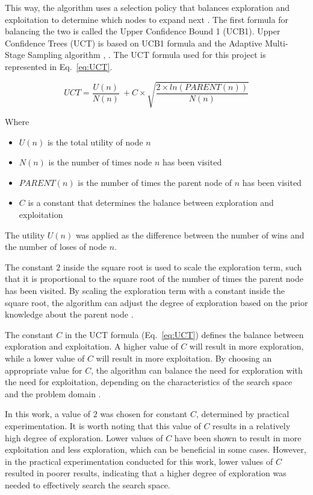 \documentclass[journal]{IEEEtran}
\begin{document}
This way, the algorithm uses a selection policy that balances exploration and exploitation to determine which nodes to expand next \cite{russell2020}. 
The first formula for balancing the two is called the Upper Confidence Bound 1 (UCB1). Upper Confidence Trees (UCT) is based on UCB1 formula and the Adaptive Multi-Stage Sampling algorithm \cite{Chang2005}, \cite{joppen2021}. The UCT formula used for this project is represented in Eq.~\ref{eq:UCT}.

\begin{equation}
    \label{eq:UCT}
    UCT = \frac{U(n)}{N(n)}\ + C \times \sqrt{\frac{2 \times ln(PARENT(n))}{N(n)}} 
\end{equation}

Where 
\begin{itemize}
    \item $U(n)$ is the total utility of node $n$
    \item $N(n)$ is the number of times node $n$ has been visited
    \item $PARENT(n)$ is the number of times the parent node of $n$ has been visited
    \item $C$ is a constant that determines the balance between exploration and exploitation
\end{itemize}

The utility $U(n)$ was applied as the difference between the number of wins and the number of loses of node $n$.

The constant $2$ inside the square root is used to scale the exploration term, such that it is proportional to the square root of the number of times the parent node has been visited. By scaling the exploration term with a constant inside the square root, the algorithm can adjust the degree of exploration based on the prior knowledge about the parent node \cite{joppen2021}.

The constant $C$ in the UCT formula (Eq.~\ref{eq:UCT}) defines the balance between exploration and exploitation. A higher value of $C$ will result in more exploration, while a lower value of $C$ will result in more exploitation. By choosing an appropriate value for $C$, the algorithm can balance the need for exploration with the need for exploitation, depending on the characteristics of the search space and the problem domain \cite{russell2020}.

In this work, a value of $2$ was chosen for constant $C$, determined by practical experimentation. It is worth noting that this value of $C$ results in a relatively high degree of exploration.
Lower values of $C$ have been shown to result in more exploitation and less exploration, which can be beneficial in some cases. However, in the practical experimentation conducted for this work, lower values of $C$ resulted in poorer results, indicating that a higher degree of exploration was needed to effectively search the search space.
\end{document}
